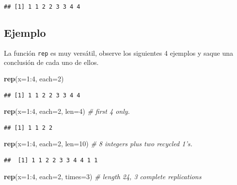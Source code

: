 \documentclass[10pt,]{krantz}
\makeatletter
\newenvironment{Shaded}{\begin{snugshade}}{\end{snugshade}}
\newcommand{\KeywordTok}[1]{\textcolor[rgb]{0.13,0.29,0.53}{\textbf{{#1}}}}
\newcommand{\DataTypeTok}[1]{\textcolor[rgb]{0.13,0.29,0.53}{{#1}}}
\newcommand{\DecValTok}[1]{\textcolor[rgb]{0.00,0.00,0.81}{{#1}}}
\newcommand{\CommentTok}[1]{\textcolor[rgb]{0.56,0.35,0.01}{\textit{{#1}}}}
\newcommand{\NormalTok}[1]{{#1}}
\newenvironment{kframe}{%
\medskip{}
\setlength{\fboxsep}{.8em}
 \def\at@end@of@kframe{}%
 \ifinner\ifhmode%
  \def\at@end@of@kframe{\end{minipage}}%
  \begin{minipage}{\columnwidth}%
 \fi\fi%
 \def\FrameCommand##1{\hskip\@totalleftmargin \hskip-\fboxsep
 \colorbox{shadecolor}{##1}\hskip-\fboxsep
     \hskip-\linewidth \hskip-\@totalleftmargin \hskip\columnwidth}%
 \MakeFramed {\advance\hsize-\width
   \@totalleftmargin\z@ \linewidth\hsize
   \@setminipage}}%
 {\par\unskip\endMakeFramed%
 \at@end@of@kframe}
\renewenvironment{Shaded}{\begin{kframe}}{\end{kframe}}
\makeatother
\begin{document}
\begin{verbatim}
## [1] 1 1 2 2 3 3 4 4
\end{verbatim}

\subsection*{Ejemplo}\label{ejemplo-12}


La función \texttt{rep} es muy versátil, observe los siguientes 4
ejemplos y saque una conclusión de cada uno de ellos.

\begin{Shaded}
\begin{Highlighting}[]
\KeywordTok{rep}\NormalTok{(}\DataTypeTok{x=}\DecValTok{1}\NormalTok{:}\DecValTok{4}\NormalTok{, }\DataTypeTok{each=}\DecValTok{2}\NormalTok{)}
\end{Highlighting}
\end{Shaded}

\begin{verbatim}
## [1] 1 1 2 2 3 3 4 4
\end{verbatim}

\begin{Shaded}
\begin{Highlighting}[]
\KeywordTok{rep}\NormalTok{(}\DataTypeTok{x=}\DecValTok{1}\NormalTok{:}\DecValTok{4}\NormalTok{, }\DataTypeTok{each=}\DecValTok{2}\NormalTok{, }\DataTypeTok{len=}\DecValTok{4}\NormalTok{)    }\CommentTok{# first 4 only.}
\end{Highlighting}
\end{Shaded}

\begin{verbatim}
## [1] 1 1 2 2
\end{verbatim}

\begin{Shaded}
\begin{Highlighting}[]
\KeywordTok{rep}\NormalTok{(}\DataTypeTok{x=}\DecValTok{1}\NormalTok{:}\DecValTok{4}\NormalTok{, }\DataTypeTok{each=}\DecValTok{2}\NormalTok{, }\DataTypeTok{len=}\DecValTok{10}\NormalTok{)   }\CommentTok{# 8 integers plus two recycled 1's.}
\end{Highlighting}
\end{Shaded}

\begin{verbatim}
##  [1] 1 1 2 2 3 3 4 4 1 1
\end{verbatim}

\begin{Shaded}
\begin{Highlighting}[]
\KeywordTok{rep}\NormalTok{(}\DataTypeTok{x=}\DecValTok{1}\NormalTok{:}\DecValTok{4}\NormalTok{, }\DataTypeTok{each=}\DecValTok{2}\NormalTok{, }\DataTypeTok{times=}\DecValTok{3}\NormalTok{)  }\CommentTok{# length 24, 3 complete replications}
\end{Highlighting}
\end{Shaded}
\end{document}
